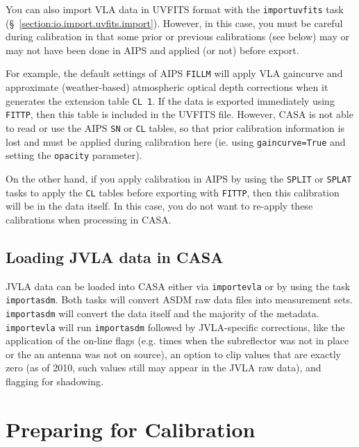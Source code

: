 You can also import VLA data in UVFITS format with the 
{\tt importuvfits} task (\S~\ref{section:io.import.uvfits.import}).
However, in this case, you must be careful during calibration in
that some prior or previous calibrations (see below) may or may not
have been done in AIPS and applied (or not) before export.

For example, the default settings of AIPS {\tt FILLM} will apply
VLA gaincurve and approximate (weather-based) atmospheric optical
depth corrections when it generates the extension table {\tt CL 1}.
If the data is exported immediately using {\tt FITTP}, then this 
table is included in the UVFITS file.  However, CASA is not able
to read or use the AIPS {\tt SN} or {\tt CL} tables, so that 
prior calibration information is lost and must be applied during
calibration here (ie. using {\tt gaincurve=True} and setting the
{\tt opacity} parameter).  

On the other hand, if you apply calibration in AIPS by using the
{\tt SPLIT} or {\tt SPLAT} tasks to apply the {\tt CL} tables before
exporting with {\tt FITTP}, then this calibration will be in the
data itself.  In this case, you do not want to re-apply these
calibrations when processing in CASA.

\subsection{Loading JVLA data in CASA}
\label{section:cal.flow.evla}

JVLA data can be loaded into CASA either via {\tt importevla} or by
using the task {\tt importasdm}. Both tasks will convert ASDM raw data
files into measurement sets. {\tt importasdm} will convert the data
itself and the majority of the metadata. {\tt importevla} will run
{\tt importasdm} followed by JVLA-specific corrections, like the
application of the on-line flags (e.g. times when the subreflector was
not in place or the an antenna was not on source), an option to clip
values that are exactly zero (as of 2010, such values still may appear
in the JVLA raw data), and flagging for shadowing.


\section{Preparing for Calibration}
\label{section:cal.prior}

